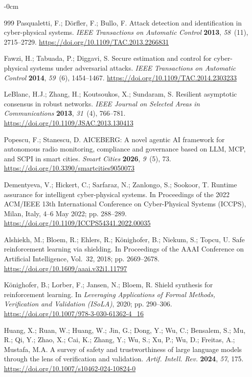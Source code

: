 \documentclass[smartcities,article,submit,moreauthors]{Definitions/mdpi}
\begin{document}
\begin{adjustwidth}{-\extralength}{0cm}
\begin{thebibliography}{999}
Pasqualetti, F.; D\"orfler, F.; Bullo, F. Attack detection and identification
in cyber-physical systems. \emph{IEEE Transactions on Automatic Control}
\textbf{2013}, \emph{58}~(11), 2715--2729.
\url{https://doi.org/10.1109/TAC.2013.2266831}

Fawzi, H.; Tabuada, P.; Diggavi, S. Secure estimation and control for
cyber-physical systems under adversarial attacks. \emph{IEEE Transactions on
Automatic Control} \textbf{2014}, \emph{59}~(6), 1454--1467.
\url{https://doi.org/10.1109/TAC.2014.2303233}

LeBlanc, H.J.; Zhang, H.; Koutsoukos, X.; Sundaram, S. Resilient asymptotic
consensus in robust networks. \emph{IEEE Journal on Selected Areas in
Communications} \textbf{2013}, \emph{31}~(4), 766--781.
\url{https://doi.org/10.1109/JSAC.2013.130413}

Popescu, F.; Stanescu, D. AICEBERG: A novel agentic AI framework for
autonomous radio monitoring, compliance and governance based on LLM, MCP, and
SCPI in smart cities. \emph{Smart Cities} \textbf{2026}, \emph{9}~(5), 73.
\url{https://doi.org/10.3390/smartcities9050073}

Dementyeva, V.; Hickert, C.; Sarfaraz, N.; Zanlongo, S.; Sookoor, T. Runtime
assurance for intelligent cyber-physical systems. In Proceedings of the 2022
ACM/IEEE 13th International Conference on Cyber-Physical Systems (ICCPS),
Milan, Italy, 4--6 May 2022; pp. 288--289.
\url{https://doi.org/10.1109/ICCPS54341.2022.00035}

Alshiekh, M.; Bloem, R.; Ehlers, R.; K\"onighofer, B.; Niekum, S.; Topcu, U.
Safe reinforcement learning via shielding. In Proceedings of the AAAI
Conference on Artificial Intelligence, Vol.~32, 2018; pp. 2669--2678.
\url{https://doi.org/10.1609/aaai.v32i1.11797}

K\"onighofer, B.; Lorber, F.; Jansen, N.; Bloem, R. Shield synthesis for
reinforcement learning. In \emph{Leveraging Applications of Formal Methods,
Verification and Validation (ISoLA)}, 2020; pp. 290--306.
\url{https://doi.org/10.1007/978-3-030-61362-4_16}

Huang, X.; Ruan, W.; Huang, W.; Jin, G.; Dong, Y.; Wu, C.; Bensalem, S.;
Mu, R.; Qi, Y.; Zhao, X.; Cai, K.; Zhang, Y.; Wu, S.; Xu, P.; Wu, D.;
Freitas, A.; Mustafa, M.A.
A survey of safety and trustworthiness of large language models through the
lens of verification and validation.
\emph{Artif. Intell. Rev.} \textbf{2024}, \emph{57}, 175.
\url{https://doi.org/10.1007/s10462-024-10824-0}


\end{thebibliography}
\end{adjustwidth}
\end{document}
